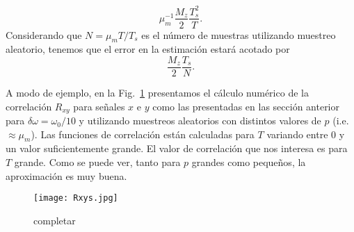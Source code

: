 \documentclass{article}
\begin{document}
\begin{equation}
    \mu_m^{-1} \frac{M_z}{2}\frac{T_s^2}{T}.
\end{equation}
Considerando que $N = \mu_m T/T_s$ es el número de muestras utilizando muestreo aleatorio, tenemos que el error en la estimación estará acotado por
\begin{equation}
    \frac{M_z}{2}\frac{T_s}{N}.
\end{equation}

A modo de ejemplo, en la Fig.~\ref{fig:rxys} presentamos el cálculo numérico de la correlación $R_{xy}$ para señales $x$ e $y$ como las presentadas en las sección anterior para $\delta\!\omega = \omega_0/10$ y utilizando muestreos aleatorios con distintos valores de $p$ (i.e. $\approx \mu_m$). Las funciones de correlación están calculadas para $T$ variando entre 0 y un valor suficientemente grande. El valor de correlación que nos interesa es para $T$ grande. Como se puede ver, tanto para $p$ grandes como pequeños, la aproximación es muy buena.

\begin{figure}
    \centering
    \texttt{[image: Rxys.jpg]}
    \caption{completar}
    \label{fig:rxys}
\end{figure}
\end{document}
